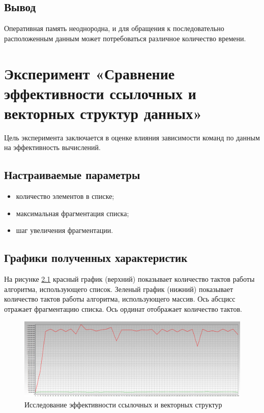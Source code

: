 \section{Вывод}

Оперативная память неоднородна, и для обращения к последовательно расположенным данным может потребоваться различное количество времени.

\chapter{Эксперимент «Сравнение эффективности ссылочных и векторных структур данных»}

Цель эксперимента заключается в оценке влияния зависимости команд по данным на эффективность вычислений.

\section{Настраиваемые параметры}

\begin{itemize}
	\item количество элементов в списке;
	\item максимальная фрагментация списка;
	\item шаг увеличения фрагментации.
\end{itemize}

\section{Графики полученных характеристик}

На рисунке \ref{img:struct} красный график (верхний) показывает количество тактов работы алгоритма, использующего список. Зеленый график (нижний) показывает количество тактов работы алгоритма, использующего массив. Ось абсцисс отражает фрагментацию списка. Ось ординат отображает количество
тактов.

\begin{figure}[H]
	\begin{center}
		\includegraphics[scale=0.3]{img/lab_03_02.jpg}
	\end{center}
	\captionsetup{justification=centering}
	\caption{Исследование эффективности ссылочных и векторных структур}
	\label{img:struct}
\end{figure}


